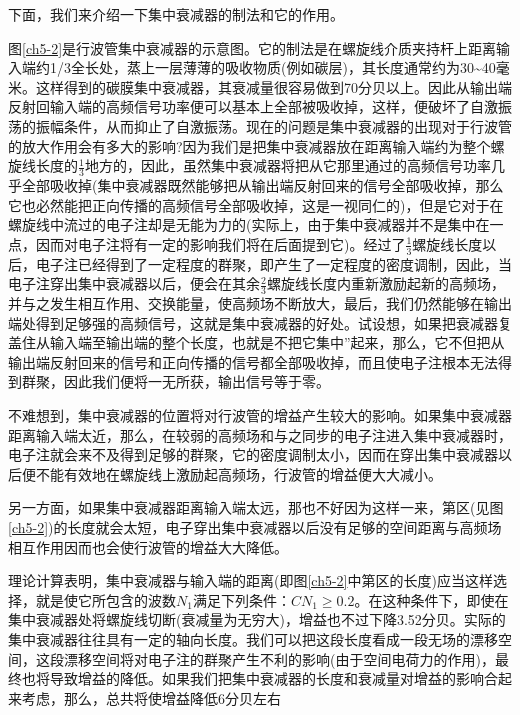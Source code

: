 下面，我们来介绍一下集中衰减器的制法和它的作用。

图\ref{ch5-2}是行波管集中衰减器的示意图。它的制法是在螺旋线介质夹持杆上距离输入端约1/3全长处，蒸上一层薄薄的吸收物质(例如碳层)，其长度通常约为30\textasciitilde40毫米。这样得到的碳膜集中衰减器，其衰减量很容易做到70分贝以上。因此从输出端反射回输入端的高频信号功率便可以基本上全部被吸收掉，这样，便破坏了自激振荡的振幅条件，从而抑止了自激振荡。现在的问题是集中衰减器的出现对于行波管的放大作用会有多大的影响?因为我们是把集中衰减器放在距离输入端约为整个螺旋线长度的$ \frac{1}{3} $地方的，因此，虽然集中衰减器将把从它那里通过的高频信号功率几乎全部吸收掉(集中衰减器既然能够把从输出端反射回来的信号全部吸收掉，那么它也必然能把正向传播的高频信号全部吸收掉，这是一视同仁的)，但是它对于在螺旋线中流过的电子注却是无能为力的(实际上，由于集中衰减器并不是集中在一点，因而对电子注将有一定的影响我们将在后面提到它)。经过了$ \frac{1}{3} $螺旋线长度以后，电子注已经得到了一定程度的群聚，即产生了一定程度的密度调制，因此，当电子注穿出集中衰减器以后，便会在其余$ \frac{2}{3} $螺旋线长度内重新激励起新的高频场，并与之发生相互作用、交换能量，使高频场不断放大，最后，我们仍然能够在输出端处得到足够强的高频信号，这就是集中衰减器的好处。试设想，如果把衰减器复盖住从输入端至输出端的整个长度，也就是不把它集中”起来，那么，它不但把从输出端反射回来的信号和正向传播的信号都全部吸收掉，而且使电子注根本无法得到群聚，因此我们便将一无所获，输出信号等于零。


不难想到，集中衰减器的位置将对行波管的增益产生较大的影响。如果集中衰减器距离输入端太近，那么，在较弱的高频场和与之同步的电子注进入集中衰减器时，电子注就会来不及得到足够的群聚，它的密度调制太小，因而在穿出集中衰减器以后便不能有效地在螺旋线上激励起高频场，行波管的增益便大大减小。


另一方面，如果集中衰减器距离输入端太远，那也不好因为这样一来，第\uppercase\expandafter{}区(见图\ref{ch5-2})的长度就会太短，电子穿出集中衰减器以后没有足够的空间距离与高频场相互作用因而也会使行波管的增益大大降低。


理论计算表明，集中衰减器与输入端的距离(即图\ref{ch5-2}中第\uppercase\expandafter{}区的长度)应当这样选择，就是使它所包含的波数$ N_1 $满足下列条件：$ CN_1 \ge 0.2 $。在这种条件下，即使在集中衰减器处将螺旋线切断(衰减量为无穷大)，增益也不过下降3.52分贝。实际的集中衰减器往往具有一定的轴向长度。我们可以把这段长度看成一段无场的漂移空间，这段漂移空间将对电子注的群聚产生不利的影响(由于空间电荷力的作用)，最终也将导致增益的降低。如果我们把集中衰减器的长度和衰减量对增益的影响合起来考虑，那么，总共将使增益降低6分贝左右


